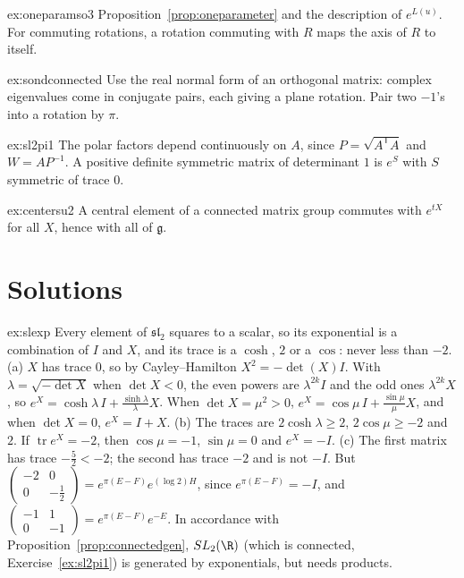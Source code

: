 \begin{hint}{ex:oneparamso3}
Proposition~\ref{prop:oneparameter} and the description of $e^{L(u)}$. For commuting rotations, a rotation commuting with $R$ maps the axis of $R$ to itself.
\end{hint}

\begin{hint}{ex:sondconnected}
Use the real normal form of an orthogonal matrix: complex eigenvalues come in conjugate pairs, each giving a plane rotation. Pair two $-1$'s into a rotation by $\pi$.
\end{hint}

\begin{hint}{ex:sl2pi1}
The polar factors depend continuously on $A$, since $P=\sqrt{A^{\mathsf T}A}$ and $W=AP^{-1}$. A positive definite symmetric matrix of determinant $1$ is $e^S$ with $S$ symmetric of trace $0$.
\end{hint}

\begin{hint}{ex:centersu2}
A central element of a connected matrix group commutes with $e^{tX}$ for all $X$, hence with all of $\mathfrak g$.
\end{hint}

\section{Solutions}

\begin{solution}{ex:slexp}
\idea Every element of $\mathfrak{sl}_2$ squares to a scalar, so its exponential is a combination of $I$ and $X$, and its trace is a $\cosh$, $2$ or a $\cos$: never less than $-2$.
\writeup (a) $X$ has trace $0$, so by Cayley--Hamilton $X^2=-\det(X)I$. With $\lambda=\sqrt{-\det X}$ when $\det X<0$, the even powers are $\lambda^{2k}I$ and the odd ones $\lambda^{2k}X$, so $e^X=\cosh\lambda\,I+\frac{\sinh\lambda}\lambda X$. When
$\det X=\mu^2>0$, $e^X=\cos\mu\,I+\frac{\sin\mu}\mu X$, and when $\det X=0$, $e^X=I+X$. (b) The traces are $2\cosh\lambda\ge2$, $2\cos\mu\ge-2$ and $2$. If $\operatorname{tr}e^X=-2$, then $\cos\mu=-1$, $\sin\mu=0$ and $e^X=-I$.
(c) The first matrix has trace $-\frac52<-2$; the second has trace $-2$ and is not $-I$. But $\begin{pmatrix}-2&0\\0&-\frac12\end{pmatrix}=e^{\pi(E-F)}e^{(\log2)H}$, since $e^{\pi(E-F)}=-I$, and
$\begin{pmatrix}-1&1\\0&-1\end{pmatrix}=e^{\pi(E-F)}e^{-E}$. In accordance with Proposition~\ref{prop:connectedgen}, $SL_2(\R)$ (which is connected, Exercise~\ref{ex:sl2pi1}) is generated by exponentials, but needs products.
\end{solution}

